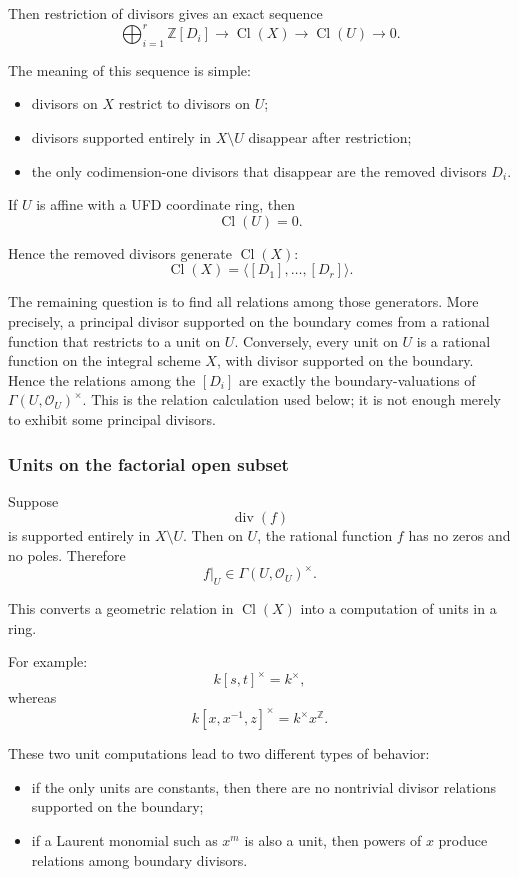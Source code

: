 Then restriction of divisors gives an exact sequence
\[
\bigoplus_{i=1}^{r}\mathbb{Z}[D_i]
\longrightarrow
\operatorname{Cl}(X)
\longrightarrow
\operatorname{Cl}(U)
\longrightarrow 0.
\]

The meaning of this sequence is simple:

\begin{itemize}
	\item divisors on \(X\) restrict to divisors on \(U\);
	\item divisors supported entirely in \(X\setminus U\) disappear after restriction;
	\item the only codimension-one divisors that disappear are the removed divisors \(D_i\).
\end{itemize}

If \(U\) is affine with a UFD coordinate ring, then
\[
\operatorname{Cl}(U)=0.
\]

Hence the removed divisors generate \(\operatorname{Cl}(X)\):
\[
\operatorname{Cl}(X)
=
\langle [D_1],\dots,[D_r]\rangle.
\]

The remaining question is to find all relations among those generators.
More precisely, a principal divisor supported on the boundary comes from
a rational function that restricts to a unit on \(U\). Conversely,
every unit on \(U\) is a rational function on the integral scheme
\(X\), with divisor supported on the boundary. Hence the relations
among the \([D_i]\) are exactly the boundary-valuations of
\(\Gamma(U,\mathcal O_U)^\times\). This is the relation calculation
used below; it is not enough merely to exhibit some principal divisors.

\subsubsection{Units on the factorial open subset}

Suppose
\[
\operatorname{div}(f)
\]
is supported entirely in \(X\setminus U\). Then on \(U\), the rational function \(f\) has no zeros and no poles. Therefore
\[
f|_U\in \Gamma(U,\mathcal{O}_U)^\times.
\]

This converts a geometric relation in \(\operatorname{Cl}(X)\) into a computation of units in a ring.

For example:
\[
k[s,t]^\times=k^\times,
\]
whereas
\[
k[x,x^{-1},z]^\times=k^\times x^{\mathbb{Z}}.
\]

These two unit computations lead to two different types of behavior:

\begin{itemize}
	\item if the only units are constants, then there are no nontrivial divisor relations supported on the boundary;
	\item if a Laurent monomial such as \(x^m\) is also a unit, then powers of \(x\) produce relations among boundary divisors.
\end{itemize}

